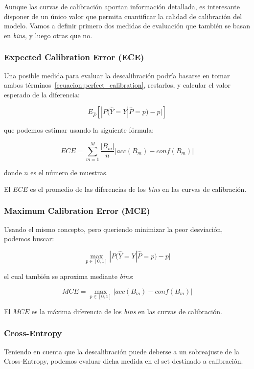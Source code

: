 Aunque las curvas de calibración aportan información detallada, es interesante
disponer de un único valor que permita cuantificar la calidad de calibración del
modelo. Vamos a definir primero dos medidas de evaluación que también se basan
en {\it bins\/}, y luego otras que no.

\subsubsection{Expected Calibration Error (ECE)}\label{calibracion:ECE}

Una posible medida para evaluar la descalibración podría basarse en tomar ambos
términos~\ref{ecuacion:perfect_calibration}, restarlos, y calcular el valor
esperado de la diferencia:

$$E_{\hat{P}}[|P(\hat{Y}= Y | \hat{P}=p) - p|]$$

que podemos estimar usando la siguiente fórmula:

$$ECE = \sum_{m=1}^{M} \frac{|B_m|}{n}|acc(B_m) - conf(B_m)|$$

donde $n$ es el número de muestras.

El $ECE$ es el promedio de las diferencias de los {\it bins\/} en las curvas de
calibración.

\subsubsection{Maximum Calibration Error (MCE)}\label{calibracion:MCE}

Usando el mismo concepto, pero queriendo minimizar la peor desviación, podemos
buscar:

$$\displaystyle \max_{p\in [0,1]}|P(\hat{Y}= Y | \hat{P}=p) - p|$$

el cual también se aproxima mediante {\it bins\/}:

$$\displaystyle MCE = \max_{p\in [0,1]}|acc(B_m) - conf(B_m)|$$

El $MCE$ es la máxima diferencia de los {\it bins\/} en las curvas de
calibración.

\subsubsection{Cross-Entropy}\label{calibracion:Cross-Entropy}

Teniendo en cuenta que la descalibración puede deberse a un sobreajuste de la
Cross-Entropy, podemos evaluar dicha medida en el set destinado a calibración.

